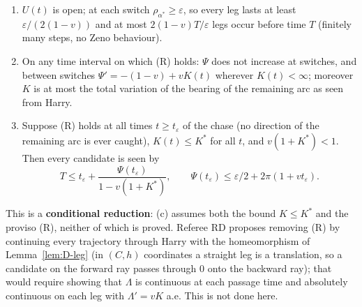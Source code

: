 \begin{proposition}\label{prop:D6}
\begin{enumerate}
\item[(a)] $U(t)$ is open; at each switch $\rho_{\alpha^*}\ge\varepsilon$, so every leg lasts at least
$\varepsilon/(2(1-v))$ and at most $2(1-v)T/\varepsilon$ legs occur before time $T$ (finitely many steps, no Zeno behaviour).
\item[(b)] On any time interval on which \textup{(R)} holds: $\Psi$ does not increase at switches, and between switches
$\Psi'=-(1-v)+vK(t)$ wherever $K(t)<\infty$; moreover $K$ is at most the total variation of the bearing of the remaining arc as
seen from Harry.
\item[(c)] Suppose \textup{(R)} holds at all times $t\ge t_\varepsilon$ of the chase (no direction of the remaining arc is ever
caught), $K(t)\le K^*$ for all $t$, and $v(1+K^*)<1$. Then every candidate is seen by
\[
T\le t_\varepsilon+\frac{\Psi(t_\varepsilon)}{1-v(1+K^*)},\qquad\Psi(t_\varepsilon)\le\varepsilon/2+2\pi(1+vt_\varepsilon).
\]
\end{enumerate}
\end{proposition}
This is a \textbf{conditional reduction}: (c) assumes both the bound $K\le K^*$ and the proviso (R), neither of which is
proved. Referee RD proposes removing (R) by continuing every trajectory through Harry with the homeomorphism of
Lemma~\ref{lem:D-leg} (in $(C,h)$ coordinates a straight leg is a translation, so a candidate on the forward ray passes through
$0$ onto the backward ray); that would require showing that $\Lambda$ is continuous at each passage time and absolutely
continuous on each leg with $\Lambda'=vK$ a.e. This is not done here.

